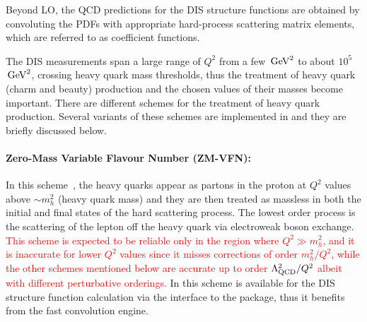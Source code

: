 Beyond LO, the QCD predictions for the DIS structure functions are obtained by convoluting 
the PDFs with appropriate hard-process scattering matrix elements, which are referred to as coefficient functions. 


%

The DIS measurements span a large range of $Q^2$ from a few $\,\text{Ge\hspace{-.08em}V}^2$ to about $10^5$ $\,\text{Ge\hspace{-.08em}V}^2$, crossing heavy quark mass thresholds, thus the treatment of heavy quark (charm and beauty) 
production and the chosen values of their masses become important. 
There are different schemes for the treatment of heavy quark production. 
Several variants of these schemes are implemented in \fitter and they are briefly discussed below.

\paragraph{Zero-Mass Variable Flavour Number (ZM-VFN)\rm:\\}
In this scheme~\cite{ZMVFNpub}, the
heavy quarks appear as partons in the proton at $Q^2$ values above $\sim m_h^2$ (heavy quark mass)
and they
are then treated as massless in both the initial 
and final states of the hard scattering process. The lowest order process is the
scattering of the lepton off the heavy quark via electroweak boson exchange.
\textcolor{red}{
This scheme is expected to be reliable only in the region where $Q^2\gg m_h^2$, and it is inaccurate for lower 
$Q^2$ values since it misses corrections of order $m_h^2/Q^2$, while the other schemes mentioned 
below are accurate up to order $\Lambda_{\rm QCD}^2/Q^2$ albeit with different perturbative orderings.
}
In \fitter this scheme is available for the DIS structure function calculation 
via the interface to the \qcdnum \cite{qcdnum} package, thus it benefits 
from the fast \qcdnum convolution engine.

